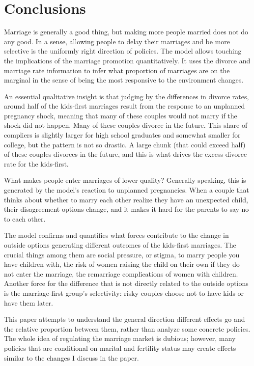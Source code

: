 \documentclass[12pt,letter]{article}
\begin{document}
\section{Conclusions}
Marriage is generally a good thing, but making more people married does not do any good. In a sense, allowing people to delay their marriages and be more selective is the uniformly right direction of policies. The model allows touching the implications of the marriage promotion quantitatively. It uses the divorce and marriage rate information to infer what proportion of marriages are on the marginal in the sense of being the most responsive to the environment changes.

An essential qualitative insight is that judging by the differences in divorce rates, around half of the kids-first marriages result from the response to an unplanned pregnancy shock, meaning that many of these couples would not marry if the shock did not happen. Many of these couples divorce in the future. This share of compliers is slightly larger for high school graduates and somewhat smaller for college, but the pattern is not so drastic. A large chunk (that could exceed half) of these couples divorces in the future, and this is what drives the excess divorce rate for the kids-first.


What makes people enter marriages of lower quality? Generally speaking, this is generated by the model's reaction to unplanned pregnancies. When a couple that thinks about whether to marry each other realize they have an unexpected child, their disagreement options change, and it makes it hard for the parents to say no to each other.

The model confirms and quantifies what forces contribute to the change in outside options generating different outcomes of the kids-first marriages. The crucial things among them are social pressure, or stigma, to marry people you have children with, the risk of women raising the child on their own if they do not enter the marriage, the remarriage complications of women with children. Another force for the difference that is not directly related to the outside options is the marriage-first group's selectivity: risky couples choose not to have kids or have them later.

This paper attempts to understand the general direction different effects go and the relative proportion between them, rather than analyze some concrete policies. The whole idea of regulating the marriage market is dubious; however, many policies that are conditional on marital and fertility status may create effects similar to the changes I discuss in the paper.
\end{document}
